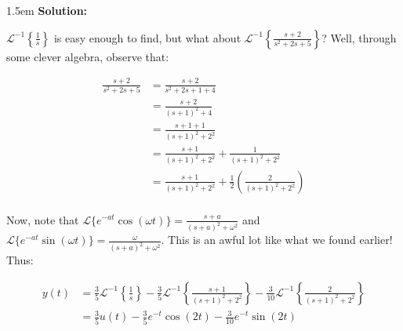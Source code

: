 \documentclass{article}
\newenvironment{solution}{
	\vspace{.5em}
	\par
	\begin{adjustwidth}{1.5em}{}
	\textbf{{Solution:}}
	\par
	\vspace{.5em}
}{
	\vspace{1em}
	\end{adjustwidth}
}
\begin{document}
\begin{solution}
	$\mathcal{L}^{-1} \left\{ \frac{1}{s} \right\}$ is easy enough to find, but what about $\mathcal{L}^{-1} \left\{ \frac{s + 2}{s^2 + 2s + 5} \right\}$? Well, through some clever algebra, observe that:

	\begin{align*}
		\frac{s + 2}{s^2 + 2s + 5} &= \frac{s + 2}{s^2 + 2s + 1 + 4} \\
			&= \frac{s + 2}{(s + 1)^2 + 4} \\
			&= \frac{s + 1 + 1}{(s + 1)^2 + 2^2} \\
			&= \frac{s + 1}{(s + 1)^2 + 2^2} + \frac{1}{(s + 1)^2 + 2^2} \\
			&= \frac{s + 1}{(s + 1)^2 + 2^2} + \frac{1}{2} \left( \frac{2}{(s + 1)^2 + 2^2} \right) \\
	\end{align*}

	Now, note that $\mathcal{L}\{e^{-at}\cos(\omega t)\} = \frac{s + a}{(s + a)^2 + \omega^2}$ and $\mathcal{L}\{e^{-at}\sin(\omega t)\} = \frac{\omega}{(s + a)^2 + \omega^2}$. This is an awful lot like what we found earlier! Thus:

	\begin{align*}
		y(t) &= \frac{3}{5} \mathcal{L}^{-1} \left\{ \frac{1}{s} \right\} - \frac{3}{5} \mathcal{L}^{-1} \left\{ \frac{s + 1}{(s + 1)^2 + 2^2} \right\} - \frac{3}{10} \mathcal{L}^{-1} \left\{ \frac{2}{(s + 1)^2 + 2^2} \right\} \\
			&= \frac{3}{5} u(t) - \frac{3}{5} e^{-t} \cos(2t) - \frac{3}{10} e^{-t} \sin(2t)
	\end{align*}
\end{solution}

\ifdefined\iscombined
	\newpage
\else
	
\end{document}
